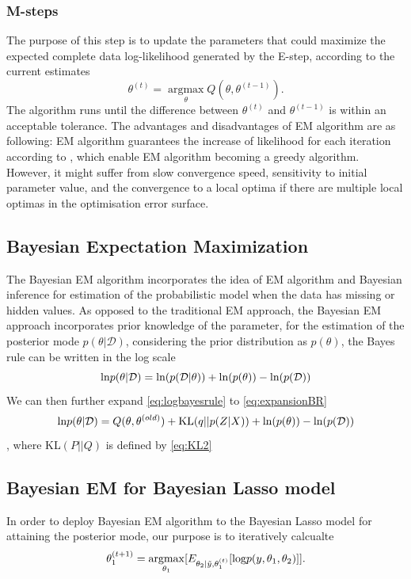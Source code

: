 \subsubsection{M-steps}
The purpose of this step is to update the parameters that could maximize the expected complete data log-likelihood generated by the E-step, according to the current estimates
\begin{equation}
	\theta^{(t)} = 
	\operatorname*{argmax}_{\theta} Q(\theta,\theta^{(t-1)}).
\end{equation}
The algorithm runs until the difference between $\theta^{(t)}$ and $\theta^{(t-1)}$ is within an acceptable tolerance. 
The advantages and disadvantages of EM algorithm are as following: EM algorithm guarantees the increase of likelihood for each iteration according to \cite{EM}, which enable EM algorithm becoming a greedy algorithm. However, it might suffer from slow convergence speed, sensitivity to initial parameter value, and the convergence to a local optima if there are multiple local optimas in the optimisation error surface.


\subsection{Bayesian Expectation Maximization}
The Bayesian EM algorithm incorporates the idea of EM algorithm and Bayesian inference for estimation of the probabilistic model when the data has missing or hidden values. As opposed to the traditional EM approach, the Bayesian EM approach incorporates prior knowledge of the parameter, for the estimation of the posterior mode $p(\theta|\mathcal{D})$, considering the prior distribution as $p(\theta)$, the Bayes rule can be written in the log scale
\begin{equation}
	\label{eq:logbayesrule}
	\textnormal{ln} p(\theta|\mathcal{D}) = \textnormal{ln}(p(\mathcal{D}|\theta)) + \textnormal{ln}(p(\theta)) - \textnormal{ln}(p(\mathcal{D}))
\end{equation}
We can then further expand \autoref{eq:logbayesrule} to \autoref{eq:expansionBR}
\begin{equation}
	\label{eq:expansionBR}
	\textnormal{ln} p(\theta|\mathcal{D}) = Q(\theta,\theta^{(old)}) + \textnormal{KL}(q||p(Z|X)) + \textnormal{ln}(p(\theta)) - \textnormal{ln}(p(\mathcal{D}))
\end{equation}
, where KL$(P||Q)$ is defined by \autoref{eq:KL2}

\subsection{Bayesian EM for Bayesian Lasso model}
In order to deploy Bayesian EM algorithm to the Bayesian Lasso model for attaining the posterior mode, our purpose is to iteratively calcualte 
\begin{equation}
	\theta_1^{(t+1)} = \operatorname*{argmax}_{\theta_1} [E_{\theta_2|\tilde{y},\theta_1^{(t)}}[\textnormal{log}p(y,\theta_1,\theta_2)]].
\end{equation}

